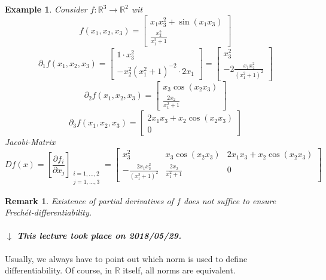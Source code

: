 \documentclass{article}
\newtheorem{example}{Example}  \numberwithin{example}{section}
\newtheorem{remark}{Remark}  \numberwithin{remark}{section}
\newcommand{\dateref}[1]{%
  \begin{mdframed}[backgroundcolor=gray!10,innerbottommargin=0pt,innertopmargin=0pt]
    \paragraph{\textit{$\downarrow$ This lecture took place on #1.}}%
  \end{mdframed}%
}
\begin{document}
\begin{example}
  Consider $f: \mathbb R^3 \to \mathbb R^2$ wit
  \[
    f(x_1, x_2, x_3) = \begin{bmatrix}
      x_1 x_3^2 + \sin(x_1 x_3) \\
      \frac{x_2^2}{x_1^2 + 1}
    \end{bmatrix}
  \]
  \[
    \partial_1 f(x_1, x_2, x_3) = \begin{bmatrix}
      1 \cdot x_3^2 \\
      -x_2^2 (x_1^2 + 1)^{-2} \cdot 2x_1
    \end{bmatrix} = \begin{bmatrix}
      x_3^2 \\
      -2 \frac{x_1 x_2^2}{(x_1^2 + 1)^2}
    \end{bmatrix}
  \] \[
    \partial_2 f(x_1, x_2, x_3) = \begin{bmatrix}
      x_3 \cos(x_2 x_3) \\
      \frac{2x_2}{x_1^2 + 1}
    \end{bmatrix}
  \] \[
    \partial_3 f(x_1, x_2, x_3) = \begin{bmatrix}
      2x_1 x_3 + x_2 \cos(x_2 x_3) \\
      0
    \end{bmatrix}
  \]
  Jacobi-Matrix
  \[
    Df(x)
    = \left[\frac{\partial f_i}{\partial x_j}\right]_{\substack{i = 1,\dots,2 \\ j = 1,\dots,3}}
    = \begin{bmatrix}
      x_3^2 & x_3 \cos(x_2 x_3) & 2 x_1 x_3 + x_2 \cos(x_2 x_3) \\
      - \frac{2x_1 x_2^2}{(x_1^2 + 1)^2} & \frac{2x_2}{x_1^2 + 1} & 0
    \end{bmatrix}
  \]
\end{example}

\begin{remark}
  Existence of partial derivatives of $f$ does not suffice to ensure Frech\'et-differentiability.
\end{remark}

\dateref{2018/05/29}

Usually, we always have to point out which norm is used to define differentiability.
Of course, in $\mathbb R$ itself, all norms are equivalent.
\end{document}
